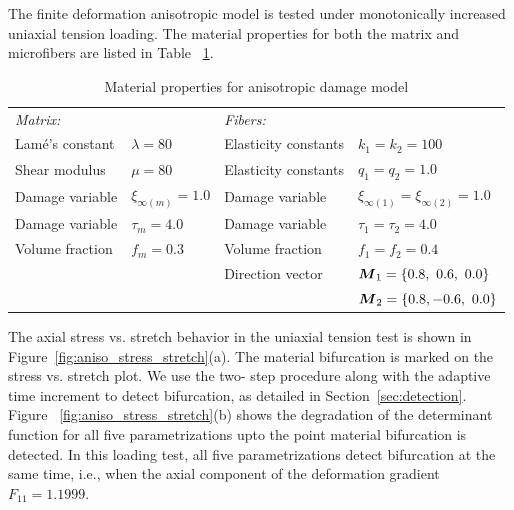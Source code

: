 \documentclass[12pt]{article}
\numberwithin{equation}{section}
\begin{document}
The finite deformation anisotropic model is tested under monotonically
increased uniaxial tension loading. The material properties for both 
the matrix and microfibers are listed in Table~
\ref{tab:aniso_material}.

\begin{table}[H]
  \begin{center}
    \begin{tabular}{ l l l l }
      \toprule
      \it{Matrix}:
      &
      
      &
     
      \it{Fibers}:
      
      &
      \\
      Lam\'{e}'s constant
      &
      $\lambda=80$
      &
      Elasticity constants
      &
      $k_1 = k_2 = 100$
      \\
      Shear modulus
      &
      $\mu = 80$
      &
      Elasticity constants
      &
      $q_1 = q_2 = 1.0$      
      \\
      Damage variable  
      &
      $\xi_{\infty(m)} = 1.0$
      &
      Damage variable
      &
      $\xi_{\infty(1)} = \xi_{\infty(2)} = 1.0$      
      \\
      Damage variable   
      &
      $\tau_m = 4.0$
      &
      Damage variable
      &
      $\tau_1 = \tau_2 = 4.0$
      \\
      Volume fraction
      &
      $f_m = 0.3$
      &
      Volume fraction
      &
      $f_1 = f_2 = 0.4$
      \\      
      &
      
      &
      Direction vector
      &
      ${\boldsymbol{M}}_1 = \{ 0.8,~0.6,~0.0\}$
      \\
      &

      &
	       
      &
      ${\boldsymbol{M}}_2 = \{ 0.8,-0.6,~0.0\}$
      \\
      \bottomrule
    \end{tabular}
    \caption{Material properties for anisotropic damage model}
    \label{tab:aniso_material}
  \end{center}
\end{table}

The axial stress vs. stretch behavior in the uniaxial tension test is 
shown in Figure~\ref{fig:aniso_stress_stretch}(a). The material 
bifurcation is marked on the stress vs. stretch plot. We use the two-
step procedure along with the adaptive time increment to detect 
bifurcation, as detailed in Section~\ref{sec:detection}. Figure~
\ref{fig:aniso_stress_stretch}(b) shows the degradation of the 
determinant function for all five parametrizations upto the point 
material bifurcation is detected. In this loading test, all five 
parametrizations detect bifurcation at the same time, i.e., when the 
axial component of the deformation gradient $F_{11} = 1.1999$. 
\end{document}
